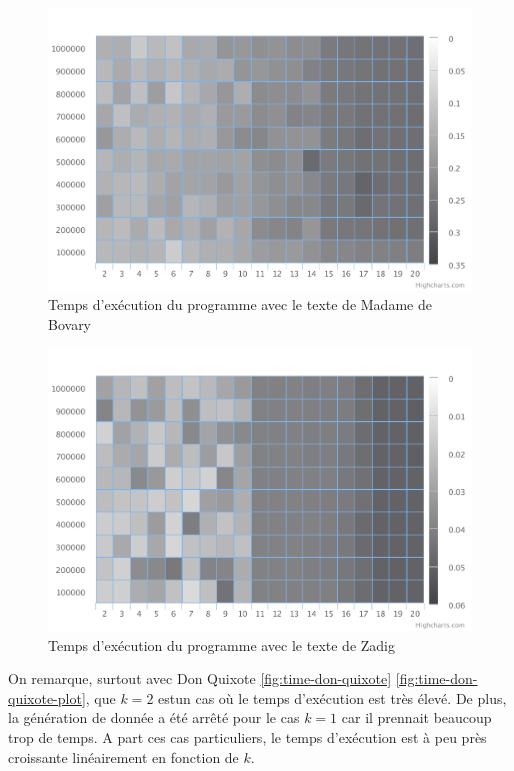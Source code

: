 \documentclass[10pt, a4paper]{article}
\begin{document}
\begin{figure}[ht]
    \centering
    \includegraphics[width=1.0\textwidth]{time-madame}
    \caption{Temps d'exécution du programme avec le texte de Madame de Bovary}
    \label{fig:time-madame}
\end{figure}

\begin{figure}[ht]
    \centering
    \includegraphics[width=1.0\textwidth]{time-zadig}
    \caption{Temps d'exécution du programme avec le texte de Zadig}
    \label{fig:time-zadig}
\end{figure}

On remarque, surtout avec Don Quixote \ref{fig:time-don-quixote}
\ref{fig:time-don-quixote-plot}, que $k=2$ estun cas où le temps d'exécution
est très élevé. De plus, la génération de donnée a été arrêté pour le cas $k=1$
car il prennait beaucoup trop de temps. A part ces cas particuliers, le temps
d'exécution est à peu près croissante linéairement en fonction de $k$. \\
\end{document}
